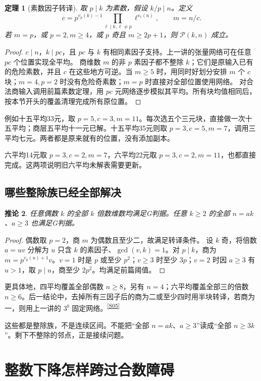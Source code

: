 \documentclass[11pt,a4paper,oneside,openany]{book}
\newcommand{\src}[1]{\textsuperscript{\hyperref[source:#1]{[#1]}}}
\newtheorem{theorem}{定理}[chapter]
\newtheorem{corollary}[theorem]{推论}
\theoremstyle{definition}\newtheorem{example}[theorem]{例}\newtheorem{conjecture}[theorem]{猜想}
\numberwithin{equation}{chapter}\setcounter{tocdepth}{1}
\begin{document}
\begin{theorem}[素数因子转译]\label{thm:factor}
取 $p\mid k$ 为素数，假设 $k/p\mid n$。定义
\[
c=p^{v_p(k)-1}\prod_{\ell\mid k,\ell\ne p}\ell^{v_\ell(n)},\qquad m=n/c.
\]
若 $m=p$，或 $p=2,m\ge4$，或 $p$ 奇且 $m\ge2p+1$，则 $\mathcal P(k,n)$ 成立。
\end{theorem}
\begin{proof}
$c\mid n$，$k\mid pc$，且 $pc$ 与 $k$ 有相同素因子支持。上一讲的张量网络可在任意 $pc$ 个位置实现全平均。
商维数 $m$ 的非 $p$ 素因子都不整除 $k$；它们是原输入已有的危险素数，并且 $c$ 在这些地方可逆。当 $m\ge5$ 时，用同时好划分安排 $m$ 个 $c$ 块；$m=4,p=2$ 时没有危险奇素数；$m=p$ 时直接对全部位置使用网络。
对合法商输入调用前篇素数定理，用 $pc$ 元网络逐步模拟其平均。所有块均值相同后，按本节开头的覆盖清理完成所有原位置。
\end{proof}

例如十五平均33元，取 $p=5,c=3,m=11$。每次选五个三元块，直接做一次十五平均；商层五平均十一元已解。十五平均35元则取 $p=3,c=5,m=7$，调用三平均七元。两者都是原来就有的位置，没有添加副本。

六平均14元取 $p=3,c=2,m=7$，六平均22元取 $p=3,c=2,m=11$，也都直接完成。这两项说明旧六平均未解表需要更新。

\section{哪些整除族已经全部解决}
\begin{corollary}
任意偶数 $k$ 的全部 $k$ 倍数维数均满足G判据。任意 $k\ge2$ 的全部 $n=ak$、$a\ge3$ 也满足G判据。
\end{corollary}
\begin{proof}
偶数取 $p=2$，商 $m$ 为偶数且至少二，故满足转译条件。
设 $k$ 奇，将倍数 $a=uv$ 分解为 $u$ 只含 $k$ 的素因子、$\gcd(v,k)=1$。对 $p\mid k$，商为 $m=p^{v_p(u)+1}v$。$v=1$ 时是 $p$ 或至少 $p^2$；$v\ge3$ 时至少 $3p$；$v=2$ 时因 $a\ge3$ 有 $u>1$，取 $p\mid u$，商至少 $2p^2$。均满足前篇阈值。
\end{proof}
更具体地，四平均覆盖全部偶数 $n\ge8$，另有 $n=4$；六平均覆盖全部三的倍数 $n\ge6$。后一结论中，去掉所有三因子后的商为二或至少四时用半块转译，若商为一，则用上一讲的 $3^b$ 固定网络。\src{S05}

这些都是整除族，不是连续区间。不能把“全部 $n=ak$、$a\ge3$”读成“全部 $n\ge3k$”。剩下不整除的邻点，正是接续问题。


\chapter{整数下降怎样跨过合数障碍}\label{ch:tail}
\end{document}
